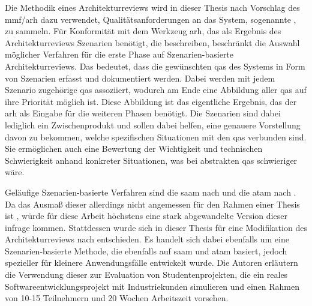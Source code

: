 Die Methodik eines Architekturreviews wird in dieser Thesis nach Vorschlag des \gls{mmf}/\gls{arh} dazu verwendet, Qualitätsanforderungen an das System, sogenannte , zu sammeln.
Für Konformität mit dem Werkzeug \gls{arh}, das als Ergebnis des Architekturreviews Szenarien benötigt, die  beschreiben, beschränkt die Auswahl möglicher Verfahren für die erste Phase auf Szenarien-basierte Architekturreviews.
Das bedeutet, dass die gewünschten \glspl{qa} des Systems in Form von Szenarien erfasst und dokumentiert werden.
Dabei werden mit jedem Szenario zugehörige \glspl{qa} assoziiert, wodurch am Ende eine Abbildung aller \glspl{qa} auf ihre Priorität möglich ist.
Diese Abbildung ist das eigentliche Ergebnis, das der \gls{arh} als Eingabe für die weiteren Phasen benötigt.
Die Szenarien sind dabei lediglich ein Zwischenprodukt und sollen dabei helfen, eine genauere Vorstellung davon zu bekommen, welche spezifischen Situationen mit den \glspl{qa} verbunden sind.
Sie ermöglichen auch eine Bewertung der Wichtigkeit und technischen Schwierigkeit anhand konkreter Situationen, was bei abstrakten \glspl{qa} schwieriger wäre.

Geläufige Szenarien-basierte Verfahren sind die \gls{saam} nach  und die \gls{atam} nach .
Da das Ausmaß dieser allerdings nicht angemessen für den Rahmen einer Thesis ist \cite{master-marvin-knodel}, würde für diese Arbeit höchstens eine stark abgewandelte Version dieser infrage kommen.
Stattdessen wurde sich in dieser Thesis für eine Modifikation des Architekturreviews nach  entschieden.
Es handelt sich dabei ebenfalls um eine Szenarien-basierte Methode, die ebenfalls auf \gls{saam} und \gls{atam} basiert, jedoch spezieller für kleinere Anwendungsfälle entwickelt wurde.
Die Autoren erläutern die Verwendung dieser zur Evaluation von Studentenprojekten, die ein reales Softwareentwicklungsprojekt mit Industriekunden simulieren und einen Rahmen von 10-15 Teilnehmern und 20 Wochen Arbeitszeit vorsehen.

